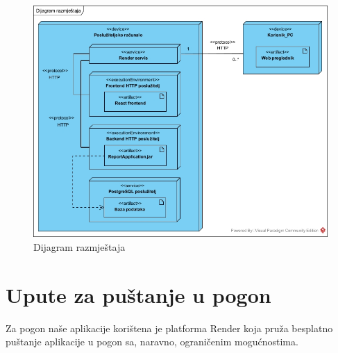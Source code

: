 			\begin{figure}[H]
				\includegraphics[scale=0.60]{slike/DR.jpg} %
				\centering
				\caption{Dijagram razmještaja}
				\label{fig:DijagramRazmjestaja}
			\end{figure}

			\eject 
		
		\section{Upute za puštanje u pogon}

			Za pogon naše aplikacije korištena je platforma Render koja pruža besplatno puštanje aplikacije u pogon sa, naravno, ograničenim mogućnostima.   

